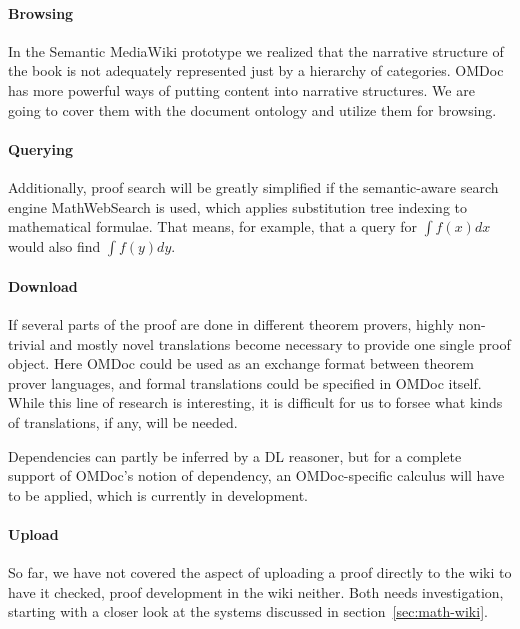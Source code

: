 \paragraph{Browsing} In the Semantic MediaWiki prototype we realized that the
narrative structure of the book is not adequately represented just by a
hierarchy of categories.  OMDoc has more powerful ways of putting content into
narrative structures\cite{KohMueMue:dfncimk07}.  We are going to cover them with
the document ontology and utilize them for browsing.

\paragraph{Querying} Additionally, proof search will be greatly simplified if
the semantic-aware search engine MathWebSearch\cite{KohSuc:asemf06} is used,
which applies substitution tree indexing to mathematical formulae.  That means,
for example, that a query for $\int f(x) dx$ would also find $\int f(y) dy$.

\paragraph{Download} If several parts of the proof are done in different
theorem provers, highly non-trivial and mostly novel translations become
necessary to provide one single proof object. Here OMDoc could be used as an
exchange format between theorem prover languages, and formal translations could
be specified in OMDoc itself.  While this line of research is interesting, it is
difficult for us to forsee what kinds of translations, if any, will be needed.

Dependencies can partly be inferred by a DL reasoner, but for a complete support
of OMDoc's notion of dependency, an OMDoc-specific calculus will have to be
applied, which is currently in development.

\paragraph{Upload} So far, we have not covered the aspect of uploading a proof
directly to the wiki to have it checked, proof development in the wiki neither.
Both needs investigation, starting with a closer look at the systems discussed
in section~\ref{sec:math-wiki}.

